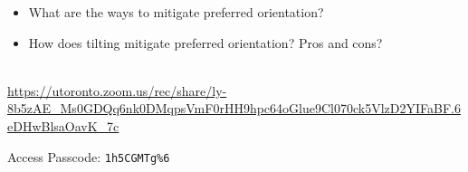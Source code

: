 \documentclass[11pt, oneside]{article}   	%
\begin{document}
\begin{itemize}
	\item What are the ways to mitigate preferred orientation?
	\item How does tilting mitigate preferred orientation? Pros and cons?
\end{itemize}

 \\
{\tiny \url{https://utoronto.zoom.us/rec/share/ly-8b5zAE_Ms0GDQq6nk0DMqpsVmF0rHH9hpc64oGlue9Cl070ck5VlzD2YIFaBF.6eDHwBlsaOavK_7c}}

Access Passcode: \texttt{1h5CGMTg\%6}

	
\end{document}
